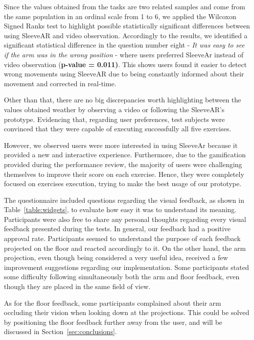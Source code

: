Since the values obtained from the tasks are two related samples and come from the same population in
an ordinal scale from 1 to 6, we applied the Wilcoxon Signed Ranks test to highlight possible statistically significant
differences between using SleeveAR and video observation. Accordingly to the results, we identified a significant statistical difference in the question number eight - \textit{It was easy to see if the arm was in the wrong position} - where users preferred SleeveAr instead of video observation (\textbf{p-value = 0.011)}. This shows users found it easier to detect wrong movements using SleeveAR due to being constantly informed about their movement and corrected in real-time. 

Other than that, there are no big discrepancies worth highlighting between the values obtained weather by observing a video or following the SleeveAR's prototype.
Evidencing that, regarding user preferences, test subjects were convinced that they were capable of executing successfully all five exercises. 

However, we observed users were more interested in using SleeveAr because it provided a new and interactive experience. 
Furthermore, due to the gamification provided during the performance review, the majority of users were challenging themselves to improve their score on each exercise. Hence, they were completely focused on exercises execution, trying to make the best usage of our prototype.

The questionnaire included questions regarding the visual feedback, as shown in Table~\ref{table:widgets}, to evaluate how easy it was to understand its meaning. Participants were also free to share any personal thoughts regarding every visual feedback presented during the tests.
In general, our feedback had a positive approval rate. Participants seemed to understand the purpose of each feedback projected on the floor and reacted accordingly to it. 
On the other hand, the arm projection, even though being considered a very useful idea, received a few improvement suggestions regarding our implementation. Some participants stated some difficulty following simultaneously both the arm and floor feedback, even though they are placed in the same field of view.

As for the floor feedback, some participants complained about their arm occluding their vision when looking down at the projections. 
This could be solved by positioning the floor feedback further away from the user, and will be discussed in Section~\ref{sec:conclusions}.

